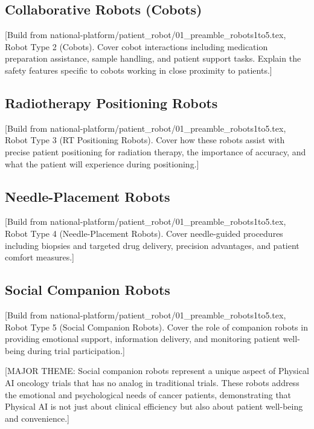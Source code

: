 \subsection{Collaborative Robots (Cobots)}
\label{subsec:instructions-cobots}

[Build from national-platform/patient\_robot/01\_preamble\_robots1to5.tex,
Robot Type 2 (Cobots). Cover cobot interactions including medication
preparation assistance, sample handling, and patient support tasks. Explain
the safety features specific to cobots working in close proximity to patients.]

\subsection{Radiotherapy Positioning Robots}
\label{subsec:instructions-rt-positioning}

[Build from national-platform/patient\_robot/01\_preamble\_robots1to5.tex,
Robot Type 3 (RT Positioning Robots). Cover how these robots assist with
precise patient positioning for radiation therapy, the importance of
accuracy, and what the patient will experience during positioning.]

\subsection{Needle-Placement Robots}
\label{subsec:instructions-needle}

[Build from national-platform/patient\_robot/01\_preamble\_robots1to5.tex,
Robot Type 4 (Needle-Placement Robots). Cover needle-guided procedures
including biopsies and targeted drug delivery, precision advantages, and
patient comfort measures.]

\subsection{Social Companion Robots}
\label{subsec:instructions-companion}

[Build from national-platform/patient\_robot/01\_preamble\_robots1to5.tex,
Robot Type 5 (Social Companion Robots). Cover the role of companion robots
in providing emotional support, information delivery, and monitoring patient
well-being during trial participation.]

[MAJOR THEME: Social companion robots represent a unique aspect of Physical AI
oncology trials that has no analog in traditional trials. These robots address
the emotional and psychological needs of cancer patients, demonstrating that
Physical AI is not just about clinical efficiency but also about patient
well-being and convenience.]

